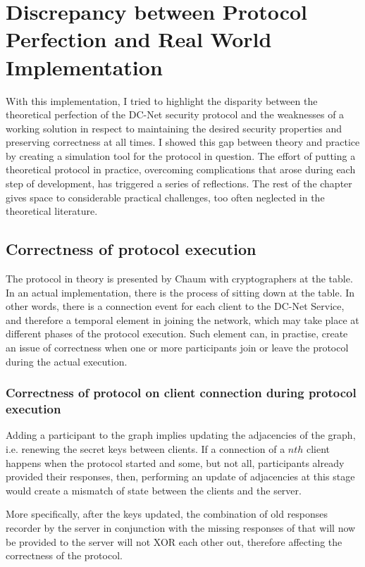 \section{Discrepancy between Protocol Perfection and Real World Implementation} \label{sec:collisionDetect}
With this implementation, I tried to highlight the disparity between the theoretical perfection of the DC-Net security protocol and the weaknesses of a working solution in respect to maintaining the desired security properties and preserving correctness at all times. I showed this gap between theory and practice by creating a simulation tool for the protocol in question. The effort of putting a theoretical protocol in practice, overcoming complications that arose during each step of development, has triggered a series of reflections. The rest of the chapter gives space to considerable practical challenges, too often neglected in the theoretical literature.

\subsection{Correctness of protocol execution}
The protocol in theory is presented by Chaum with cryptographers at the table. In an actual implementation, there is the process of sitting down at the table. In other words, there is a connection event for each client to the DC-Net Service, and therefore a temporal element in joining the network, which may take place at different phases of the protocol execution. Such element can, in practise, create an issue of correctness when one or more participants join or leave the protocol during the actual execution.

\subsubsection{Correctness of protocol on client connection during protocol execution}
Adding a participant to the graph implies updating the adjacencies of the graph, i.e. renewing the secret keys between clients. If a connection of a $nth$ client happens when the protocol started and some, but not all, participants already provided their responses, then, performing an update of adjacencies at this stage would create a mismatch of state between the clients and the server.

More specifically, after the keys updated, the combination of old responses recorder by the server in conjunction with the missing responses of that will now be provided to the server will not XOR each other out, therefore affecting the correctness of the protocol.

